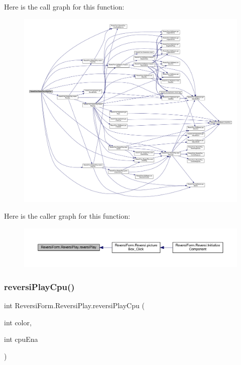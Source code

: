 Here is the call graph for this function\+:
\nopagebreak
\begin{figure}[H]
\begin{center}
\leavevmode
\includegraphics[width=350pt]{class_reversi_form_1_1_reversi_play_a7f3822227e59fac0f998927a6566006e_cgraph}
\end{center}
\end{figure}
Here is the caller graph for this function\+:
\nopagebreak
\begin{figure}[H]
\begin{center}
\leavevmode
\includegraphics[width=350pt]{class_reversi_form_1_1_reversi_play_a7f3822227e59fac0f998927a6566006e_icgraph}
\end{center}
\end{figure}
\mbox{\label{class_reversi_form_1_1_reversi_play_abec0ea86adfc0d2f960af71235eea016}} 
\subsubsection{\texorpdfstring{reversi\+Play\+Cpu()}{reversiPlayCpu()}}
{\footnotesize\ttfamily int Reversi\+Form.\+Reversi\+Play.\+reversi\+Play\+Cpu (\begin{DoxyParamCaption}\item[{int}]{color,  }\item[{int}]{cpu\+Ena }\end{DoxyParamCaption})}



